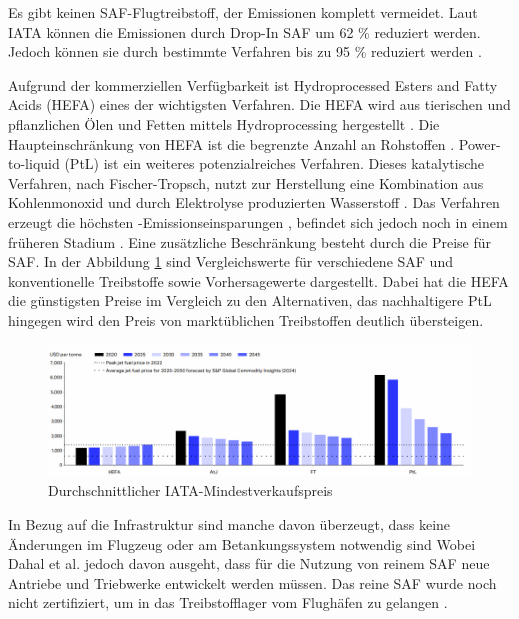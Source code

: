 Es gibt keinen SAF-Flugtreibstoff, der Emissionen komplett vermeidet. 
Laut IATA können die Emissionen durch Drop-In SAF um 62 \% reduziert werden.
Jedoch können sie durch bestimmte Verfahren bis zu 95 \% reduziert werden \cite{icao_saf_conversion_2024}.


 
Aufgrund der kommerziellen Verfügbarkeit ist Hydroprocessed Esters and Fatty Acids (HEFA) eines der wichtigsten Verfahren.
Die HEFA wird aus tierischen und pflanzlichen Ölen und Fetten mittels Hydroprocessing hergestellt \cite{bauen2020sustainable}. 
Die Haupteinschränkung von HEFA ist die begrenzte Anzahl an Rohstoffen \cite{bauen2020sustainable}.
Power-to-liquid (PtL) ist ein weiteres potenzialreiches Verfahren.
Dieses katalytische Verfahren, nach Fischer-Tropsch, nutzt zur Herstellung eine Kombination aus 
Kohlenmonoxid  und durch Elektrolyse produzierten Wasserstoff  \cite{bauen2020sustainable}.
Das Verfahren erzeugt die höchsten -Emissionseinsparungen \cite{de2017life}, 
befindet sich jedoch noch in einem früheren Stadium \cite{bauen2020sustainable}.
Eine zusätzliche Beschränkung besteht durch die Preise für SAF. 
In der Abbildung \ref{safpreis} sind Vergleichswerte für verschiedene SAF 
und konventionelle Treibstoffe sowie Vorhersagewerte dargestellt.
Dabei hat die HEFA die günstigsten Preise im Vergleich zu den Alternativen, 
das nachhaltigere PtL hingegen wird den Preis von marktüblichen Treibstoffen deutlich übersteigen.

\begin{figure}[h]
	\centering
	\includegraphics[width=0.8\linewidth]{Bilder/Preise SAF.png}
	\caption[Durchschnittlicher IATA-Mindestverkaufspreis (MSP) der wichtigsten SAF-Pfade über den Zeitraum 2020 bis 2050]{Durchschnittlicher IATA-Mindestverkaufspreis \cite{icao_saf_conversion_2024}}
	\label{safpreis}
\end{figure}
In Bezug auf die Infrastruktur sind manche davon überzeugt, dass keine Änderungen im Flugzeug oder am Betankungssystem notwendig sind \cite{sky2020hydrogen} %
Wobei Dahal et al. \cite{dahal2021techno} jedoch davon ausgeht, dass für die Nutzung von reinem SAF neue Antriebe und Triebwerke entwickelt werden müssen.
Das reine SAF wurde noch nicht zertifiziert, um in das Treibstofflager vom Flughäfen zu gelangen \cite{iata_saf_2024}.


